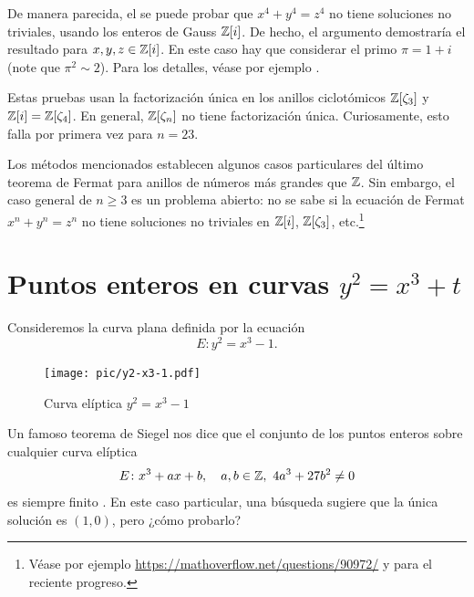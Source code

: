 \begin{comentario}
  De manera parecida, el se puede probar que $x^4 + y^4 = z^4$ no tiene
  soluciones no triviales, usando los enteros de Gauss $\mathbb{Z} [i]$. De hecho, el
  argumento demostraría el resultado para $x,y,z\in \mathbb{Z} [i]$. En este caso hay
  que considerar el primo $\pi = 1 + i$ (note que $\pi^2 \sim 2$). Para los
  detalles, véase por ejemplo \cite[\S I.3]{Ribenboim-FLT}.

  Estas pruebas usan la factorización única en los anillos ciclotómicos
  $\mathbb{Z} [\zeta_3]$ y $\mathbb{Z} [i] = \mathbb{Z} [\zeta_4]$. En general, $\mathbb{Z} [\zeta_n]$
  no tiene factorización única. Curiosamente, esto falla por primera vez para
  $n = 23$.

  Los métodos mencionados establecen algunos casos particulares del último
  teorema de Fermat para anillos de números más grandes que $\mathbb{Z}$. Sin embargo,
  el caso general de $n \ge 3$ es un problema abierto: no se sabe si la ecuación
  de Fermat $x^n + y^n = z^n$ no tiene soluciones no triviales en $\mathbb{Z} [i]$,
  $\mathbb{Z} [\zeta_3]$, etc.\footnote{Véase por ejemplo
    \url{https://mathoverflow.net/questions/90972/} y \cite{Turcas-2018}
    para el reciente progreso.}
\end{comentario}


\section{Puntos enteros en curvas \texorpdfstring{$y^2 = x^3 + t$}{y² = x³ + t}}

Consideremos la curva plana definida por la ecuación
$$E\colon y^2 = x^3 - 1.$$

\begin{figure}
  \begin{center}
    \texttt{[image: pic/y2-x3-1.pdf]}
  \end{center}

  \caption{Curva elíptica $y^2 = x^3 - 1$}
  \label{fig:y2-x3-1}
\end{figure}

Un famoso teorema de Siegel nos dice que el conjunto de los puntos enteros sobre
cualquier curva elíptica
$$E\colon x^3 + ax + b, \quad a, b \in \mathbb{Z}, ~ 4a^3 + 27 b^2 \ne 0$$
es siempre finito \cite[\S X.3]{Silverman-GTM106}. En este caso particular,
una búsqueda sugiere que la única solución es $(1,0)$, pero ¿cómo probarlo?

